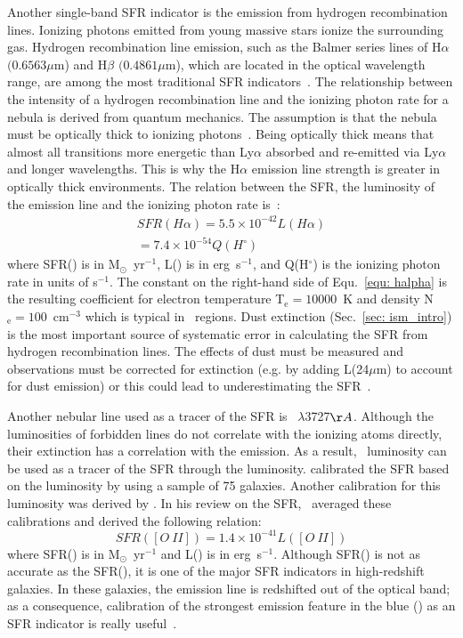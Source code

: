 Another single-band SFR indicator is the emission from hydrogen recombination lines. 
Ionizing photons emitted from young massive stars ionize the surrounding gas. Hydrogen recombination line emission, such as the Balmer series lines of H${\alpha}$ $(0.6563 \mu$m) and H${\beta}$ $(0.4861 \mu$m), which are located in the optical wavelength range, are among the most traditional SFR indicators~\citep{Kennicutt98a}. 
The relationship between the intensity of a hydrogen recombination line and the ionizing photon rate for a nebula is derived from quantum mechanics. 
The assumption is that the nebula must be optically thick to ionizing photons~\citep{Osterbrock06}.
Being optically thick means that almost all transitions more energetic than Ly${\alpha}$ absorbed and re-emitted via Ly${\alpha}$ and longer wavelengths.
This is why the H${\alpha}$ emission line strength is greater in optically thick environments. The relation between the SFR, the luminosity of the \halpha emission line and the ionizing photon rate is~\citep[e.g.,][]{Osterbrock06, Kennicutt98b}:
\begin{align}
\label{equ: halpha}
SFR(H\alpha) = 5.5 \times 10^{-42}L(H\alpha) \\
                     = 7.4 \times 10^{-54}Q(H^{\circ})
\end{align}
where SFR(\halpha) is in M$_{\odot}$~yr$^{-1}$, L(\halpha) is in erg~s$^{-1}$, and Q(H$^{\circ}$) is the ionizing photon rate in units of s$^{-1}$.
The constant on the right-hand side of Equ.~\ref{equ: halpha} is the resulting coefficient for electron temperature T$_{\mathrm{e}}=10000$~K and density N$_{\mathrm{e}}=100$~cm$^{-3}$ which is typical in \hii~regions.
Dust extinction (Sec.~\ref{sec: ism_intro}) is the most important source of systematic error in calculating the SFR from hydrogen recombination lines.
The effects of dust must be measured and \halpha observations must be corrected for extinction (e.g. by adding L(24$\mu$m) to account for dust emission) or this could lead to underestimating the SFR~\citep{Kennicutt98b}.


Another nebular line used as a tracer of the SFR is \oii~$\lambda$3727$\AA$. 
Although the luminosities of forbidden lines do not correlate with the ionizing atoms directly, their extinction has a correlation with the \halpha emission. 
As a result, \oii~luminosity can be used as a tracer of the SFR through the \halpha luminosity. 
\cite{Gallagher89} calibrated the SFR based on the \oii luminosity by using a sample of 75 galaxies. 
Another calibration for this luminosity was derived by \cite{Kennicutt92}. 
In his review on the SFR,~\citep{Kennicutt98b} averaged these calibrations and derived the following relation:
\begin{equation}
SFR([O\ II]) = 1.4 \times 10^{-41} L([O\ II])
\end{equation}  
where SFR(\oii) is in M$_{\odot}$~yr$^{-1}$ and L(\oii) is in erg~s$^{-1}$.
Although SFR(\oii) is not as accurate as the SFR(\halpha), it is one of the major SFR indicators in high-redshift galaxies.
In these galaxies, the \halpha emission line is redshifted out of the optical band; as a consequence, calibration of the strongest emission feature in the blue (\oii) as an SFR indicator is really useful~\citep{Kennicutt98b}.


